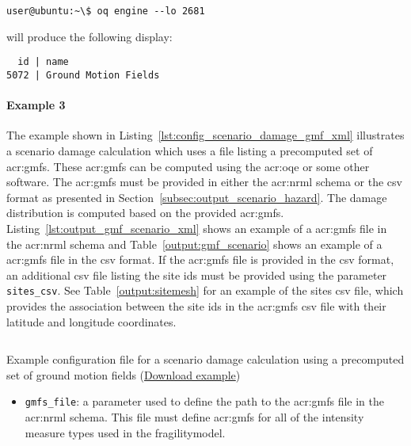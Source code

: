 \begin{verbatim}
user@ubuntu:~\$ oq engine --lo 2681
\end{verbatim}

will produce the following display:

\begin{verbatim}
  id | name
5072 | Ground Motion Fields
\end{verbatim}


\paragraph{Example 3}

The example shown in Listing~\ref{lst:config_scenario_damage_gmf_xml} illustrates
a scenario damage calculation which uses a file listing a precomputed set of
\glspl{acr:gmf}. These \glspl{acr:gmf} can be computed using the
\glsdesc{acr:oqe} or some other software. The \glspl{acr:gmf} must be provided
in either the \gls{acr:nrml} schema or the csv format as presented in
Section~\ref{subsec:output_scenario_hazard}. The damage distribution is
computed based on the provided \glspl{acr:gmf}.
Listing~\ref{lst:output_gmf_scenario_xml} shows an example of a
\glspl{acr:gmf} file in the \gls{acr:nrml} schema and
Table~\ref{output:gmf_scenario} shows an example of a \glspl{acr:gmf} file in
the csv format. If the \glspl{acr:gmf} file is provided in the csv format, an
additional csv file listing the site ids must be provided using the parameter
\Verb+sites_csv+. See Table~\ref{output:sitemesh} for an example of the sites
csv file, which provides the association between the site ids in the
\glspl{acr:gmf} csv file with their latitude and longitude coordinates.

\begin{listing}[htbp]
  \inputminted[firstline=1,firstnumber=1,fontsize=\footnotesize,frame=single,linenos,bgcolor=lightgray,label=job.ini]{ini}{oqum/risk/verbatim/config_scenario_damage_gmf_xml.ini}
  \caption{Example configuration file for a scenario damage calculation using a precomputed set of ground motion fields (\href{https://raw.githubusercontent.com/gem/oq-engine/master/doc/manual/oqum/risk/verbatim/config_scenario_damage_gmf_xml.ini}{Download example})}
  \label{lst:config_scenario_damage_gmf_xml}
\end{listing}

\begin{itemize}

  \item \Verb+gmfs_file+: a parameter used to define the path
    to the \glspl{acr:gmf} file in the \gls{acr:nrml} schema. This file must
    define \glspl{acr:gmf} for all of the intensity measure types used in the
    \gls{fragilitymodel}.

\end{itemize}

